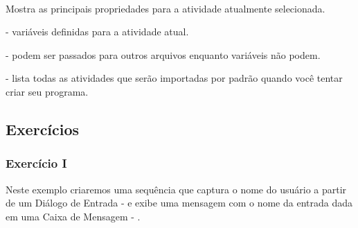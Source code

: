 \documentclass[letterpaper,10pt,brazil]{sphinxmanual}
\begin{document}
\paragraph{}
\label{\detokenize{interface_guide:painel-de-propriedades}}
\begin{figure}[htbp]
\centering

\noindent{}
\end{figure}

Mostra as principais propriedades para a atividade atualmente selecionada.
\begin{description}
\item[{ - variáveis definidas para a atividade atual.}] \leavevmode
\begin{figure}[htbp]
\centering

\noindent{}
\end{figure}

\item[{ - podem ser passados para outros arquivos enquanto variáveis não podem.}] \leavevmode
\begin{figure}[htbp]
\centering

\noindent{}
\end{figure}

\item[{ - lista todas as atividades que serão importadas por padrão quando você tentar criar seu programa.}] \leavevmode
\begin{figure}[htbp]
\centering

\noindent{}
\end{figure}

\end{description}


\subsection{Exercícios}
\label{\detokenize{exercises:exercicios}}\label{\detokenize{exercises::doc}}

\subsubsection{Exercício I}
\label{\detokenize{exercises:exercicio-i}}
Neste exemplo criaremos uma sequência que captura o nome do usuário a partir de um Diálogo de Entrada  -  e exibe uma mensagem  com o nome da entrada dada em uma Caixa de Mensagem - .
\end{document}
